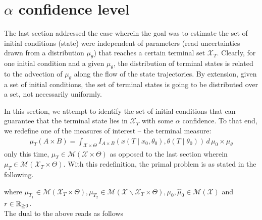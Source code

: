 \documentclass[10pt]{scrartcl}
\theoremstyle{remark}
\providecommand{\R}{\ensuremath \mathbb{R}}
\providecommand{\ip}[1]{\ensuremath \langle #1\rangle}
\begin{document}
\section{$\alpha$ confidence level}
The last section addressed the case wherein the goal was to estimate the set of initial conditions (state) were independent of parameters (read uncertainties drawn from a distribution $\mu_\theta$) that reaches a certain terminal set $\mathcal X_T$. Clearly, for one initial condition and a given $\mu_\theta$, the distribution of terminal states is related to the advection of $\mu_\theta$ along the flow of the state trajectories. By extension, given a set of initial conditions, the set of terminal states is going to be distributed over a set, not necessarily uniformly.\par
In this section, we attempt to identify the set of initial conditions that can guarantee that the terminal state lies in $\mathcal X_T$ with some $\alpha $ confidence.
To that end, we redefine one of the measures of interest -- the terminal measure:
\begin{align}
\mu_T(A\times B)=\int_{\mathcal X\times \Theta} I_{A\times B}(x(T\mid x_0,\theta_0),\theta(T\mid \theta_0))\,d\,\mu_0\times \mu_\theta	
\end{align}
only this time, $\mu_T\in \mathcal M(\mathcal X\times \Theta)$ as opposed to the last section wherein $\mu_T\in \mathcal M(\mathcal X_T\times \Theta)$. With this redefinition, the primal problem is as stated in the following.
where $\mu_{T_1}\in \mathcal M(\mathcal X_T\times \Theta), \mu_{T_2}\in \mathcal M(\mathcal X\backslash \mathcal X_T\times \Theta),\mu_0,\hat \mu_0\in \mathcal M(\mathcal X)$ and $r\in \R_{\ge 0}$.\\ 
The dual to the above reads as follows
\end{document}
